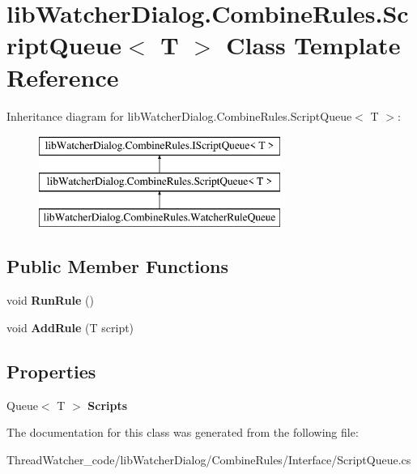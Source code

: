 \hypertarget{classlib_watcher_dialog_1_1_combine_rules_1_1_script_queue_3_01_t_01_4}{\section{lib\+Watcher\+Dialog.\+Combine\+Rules.\+Script\+Queue$<$ T $>$ Class Template Reference}
\label{classlib_watcher_dialog_1_1_combine_rules_1_1_script_queue_3_01_t_01_4}
}
Inheritance diagram for lib\+Watcher\+Dialog.\+Combine\+Rules.\+Script\+Queue$<$ T $>$\+:\begin{figure}[H]
\begin{center}
\leavevmode
\includegraphics[height=3.000000cm]{classlib_watcher_dialog_1_1_combine_rules_1_1_script_queue_3_01_t_01_4}
\end{center}
\end{figure}
\subsection*{Public Member Functions}
\begin{DoxyCompactItemize}
\item 
\hypertarget{classlib_watcher_dialog_1_1_combine_rules_1_1_script_queue_3_01_t_01_4_a19f5c76447c080f4db77a3bab30d9199}{void {\bfseries Run\+Rule} ()}\label{classlib_watcher_dialog_1_1_combine_rules_1_1_script_queue_3_01_t_01_4_a19f5c76447c080f4db77a3bab30d9199}

\item 
\hypertarget{classlib_watcher_dialog_1_1_combine_rules_1_1_script_queue_3_01_t_01_4_aeac9bfb0a0dd4e45830584629718cf88}{void {\bfseries Add\+Rule} (T script)}\label{classlib_watcher_dialog_1_1_combine_rules_1_1_script_queue_3_01_t_01_4_aeac9bfb0a0dd4e45830584629718cf88}

\end{DoxyCompactItemize}
\subsection*{Properties}
\begin{DoxyCompactItemize}
\item 
\hypertarget{classlib_watcher_dialog_1_1_combine_rules_1_1_script_queue_3_01_t_01_4_a23c40fc4d77402f733caa896eec62c79}{Queue$<$ T $>$ {\bfseries Scripts}}\label{classlib_watcher_dialog_1_1_combine_rules_1_1_script_queue_3_01_t_01_4_a23c40fc4d77402f733caa896eec62c79}

\end{DoxyCompactItemize}


The documentation for this class was generated from the following file\+:\begin{DoxyCompactItemize}
\item 
Thread\+Watcher\+\_\+code/lib\+Watcher\+Dialog/\+Combine\+Rules/\+Interface/Script\+Queue.\+cs\end{DoxyCompactItemize}
